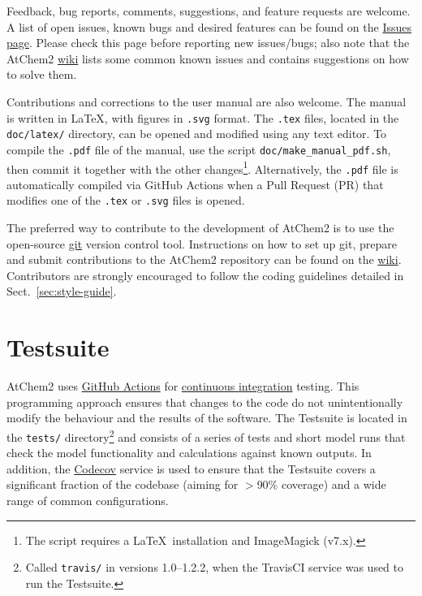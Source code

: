 Feedback, bug reports, comments, suggestions, and feature requests are welcome. A list of open
issues, known bugs and desired features can be found on the
\href{https://github.com/AtChem/AtChem2/issues}{Issues page}. Please check this page before
reporting new issues/bugs; also note that the AtChem2
\href{https://github.com/AtChem/AtChem2/wiki}{wiki} lists some common known issues and contains
suggestions on how to solve them.

Contributions and corrections to the user manual are also welcome. The manual is written in
\LaTeX, with figures in \texttt{.svg} format. The \texttt{.tex} files, located in the
\texttt{doc/latex/} directory, can be opened and modified using any text editor. To compile the
\texttt{.pdf} file of the manual, use the script \texttt{doc/make\_manual\_pdf.sh}, then
commit it together with the other changes\footnote{The script requires a \LaTeX\ installation
  and ImageMagick (v7.x).}. Alternatively, the \texttt{.pdf} file is automatically compiled via
GitHub Actions when a Pull Request (PR) that modifies one of the \texttt{.tex} or \texttt{.svg}
files is opened.

The preferred way to contribute to the development of AtChem2 is to use the open-source
\href{https://swcarpentry.github.io/git-novice}{git} version control tool. Instructions on how
to set up git, prepare and submit contributions to the AtChem2 repository can be found on the
\href{https://github.com/AtChem/AtChem2/wiki/How-to-contribute}{wiki}. Contributors are
strongly encouraged to follow the coding guidelines detailed in Sect.~\ref{sec:style-guide}.

\section{Testsuite} \label{sec:testsuite}

AtChem2 uses \href{https://github.com/features/actions}{GitHub Actions} for
\underline{continuous integration} testing. This programming approach ensures that changes to
the code do not unintentionally modify the behaviour and the results of the software. The
Testsuite is located in the \texttt{tests/} directory\footnote{Called \texttt{travis/} in
  versions 1.0--1.2.2, when the TravisCI service was used to run the Testsuite.} and consists
of a series of tests and short model runs that check the model functionality and calculations
against known outputs. In addition, the \href{https://codecov.io}{Codecov} service is used to
ensure that the Testsuite covers a significant fraction of the codebase (aiming for $>$90\%
coverage) and a wide range of common configurations.

